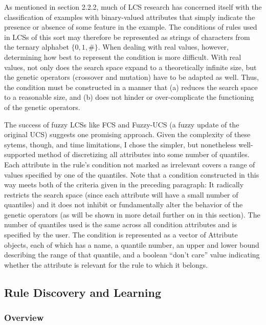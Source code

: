 \documentclass[11pt]{article}
\begin{document}
As mentioned in section 2.2.2, much of LCS research has concerned itself with the classification of examples with binary-valued attributes that simply indicate the presence or absence of some feature in the example. The conditions of rules used in LCSs of this sort may therefore be represented as strings of characters from the ternary alphabet $\{0,1,\#\}$. When dealing with real values, however, determining how best to represent the condition is more difficult. With real values, not only does the search space expand to a theoretically infinite size, but the genetic operators (crossover and mutation) have to be adapted as well. Thus, the condition must be constructed in a manner that (a) reduces the search space to a reasonable size, and (b) does not hinder or over-complicate the functioning of the genetic operators.

The success of fuzzy LCSs like FCS \cite{manuel_valenzuela-rendon_fuzzy_1991} and Fuzzy-UCS \cite{orriols-puig_fuzzy-ucs:_2009} (a fuzzy update of the original UCS) suggests one promising approach. Given the complexity of these sytems, though, and time limitations, I chose the simpler, but nonetheless well-supported method of discretizing all attributes into some number of quantiles. Each attribute in the rule's condition not marked as irrelevant covers a range of values specified by one of the quantiles. Note that a condition constructed in this way meets both of the criteria given in the preceding paragraph: It radically restricts the search space (since each attribute will have a small number of quantiles) and it does not inhibit or fundamentally alter the behavior of the genetic operators (as will be shown in more detail further on in this section). The number of quantiles used is the same across all condition attributes and is specified by the user. The condition is represented as a vector of Attribute objects, each of which has a name, a quantile number, an upper and lower bound describing the range of that quantile, and a boolean ``don't care'' value indicating whether the attribute is relevant for the rule to which it belongs.

\subsection{Rule Discovery and Learning}

\subsubsection{Overview}
\end{document}
